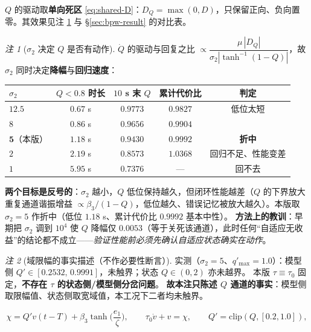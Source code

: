 \documentclass[11pt,a4paper]{article}
\theoremstyle{remark}\newtheorem{remark}{注}
\newcommand{\st}{\operatorname{tanh}}
\newcommand{\ath}{\operatorname{tanh}^{-1}}
\begin{document}
$Q$ 的驱动取\textbf{单向死区} \eqref{eq:shared-D}：$D_Q=\max(0,D)$，只保留正向、负向置零。其效果见注 \ref{rem:one-sided} 与 \S\ref{sec:bpw-result} 的对比表。
\begin{remark}[$\sigma_2$ 决定 $Q$ 是否有动作]\label{rem:one-sided}
$\dot Q$ 的驱动与回复之比 $\propto\dfrac{\mu\,|D_Q|}{\sigma_2|{\ath}(1-Q)|}$，故 $\sigma_2$ 同时决定\textbf{降幅}与\textbf{回归速度}：
\begin{center}\small
\begin{tabular}{@{}lcccc@{}}
\toprule
$\sigma_2$ & $Q<0.8$ 时长 & $10$ s 末 $Q$ & 累计代价比 & 判定 \\
\midrule
$12.5$ & $0.67$ s & $0.9773$ & $0.9827$ & 低位太短 \\
$8$ & $0.86$ s & $0.9656$ & $0.9904$ & \\
$\mathbf{5}$（本版） & $\mathbf{1.18}$ s & $\mathbf{0.9430}$ & $\mathbf{0.9992}$ & \textbf{折中} \\
$2$ & $2.19$ s & $0.8573$ & $1.0368$ & 回归不足、性能变差 \\
$1$ & $5.95$ s & $0.7376$ & --- & 回不去 \\
\bottomrule
\end{tabular}
\end{center}
\textbf{两个目标是反号的}：$\sigma_2$ 越小，$Q$ 低位保持越久，但闭环性能越差（$Q$ 的下界放大重复通道谐振增益 $\propto\beta_3/(1-Q)$，低位越久、错误记忆被放大越久）。本版取 $\sigma_2=5$ 作折中（低位 $1.18$ s、累计代价比 $0.9992$ 基本中性）。
\textbf{方法上的教训}：早期把 $\sigma_2$ 调到 $10^{4}$ 使 $Q$ 降幅仅 $0.0053$（等于关死该通道），此时任何“自适应无收益”的结论都不成立——\emph{验证性能前必须先确认自适应状态确实在动作}。
\end{remark}

\begin{remark}[域限幅的事实描述（不作必要性断言）]\label{rem:proj-fact}
实测（$\sigma_2=5$、$q'_{\max}=1.0$）：模型侧 $Q'\in[0.2532,\,0.9991]$，未触界；状态 $Q\in(0,2)$ 亦未越界。
本版 $\tau\equiv\tau_0$ 固定，\textbf{不存在 $\tau$ 的状态侧/模型侧分岔问题}。
\textbf{故本注只陈述 $Q$ 通道的事实}：模型侧取限幅值、状态侧取宽域值，本工况下二者均未触界。
\end{remark}
\begin{equation}
  \chi = Q' v(t-T)+\beta_3\st\!\Big(\frac{e_1}{\zeta}\Big),\qquad \tau_0\dot v+v=\chi,\qquad
  Q'=\mathrm{clip}(Q,[0.2,1.0]) ,
  \label{eq:clip-model}
\end{equation}
\end{document}
